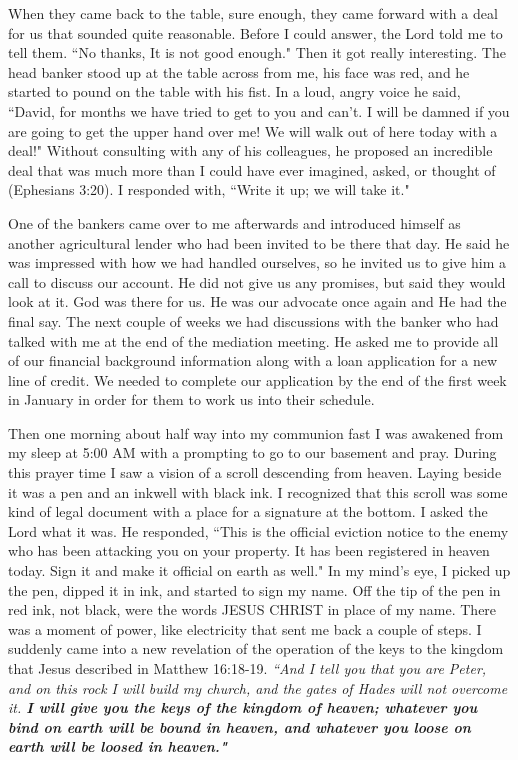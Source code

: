 \documentclass[oneside,12pt]{book}
\begin{document}
When they came back to the table, sure enough, they came forward with a deal for us that sounded quite reasonable. Before I could answer, the Lord told me to tell them. ``No thanks, It is not good enough." Then it got really interesting. The head banker stood up at the table across from me, his face was red, and he started to pound on the table with his fist. In a loud, angry voice he said, ``David, for months we have tried to get to you and can't. I will be damned if you are going to get the upper hand over me! We will walk out of here today with a deal!" Without consulting with any of his colleagues, he proposed an incredible deal that was much more than I could have ever imagined, asked, or thought of (Ephesians 3:20). I responded with, ``Write it up; we will take it." 

One of the bankers came over to me afterwards and introduced himself as another agricultural lender who had been invited to be there that day. He said he was impressed with how we had handled ourselves, so he invited us to give him a call to discuss our account. He did not give us any promises, but said they would look at it. God was there for us. He was our advocate once again and He had the final say. The next couple of weeks we had discussions with the banker who had talked with me at the end of the mediation meeting. He asked me to provide all of our financial background information along with a loan application for a new line of credit. We needed to complete our application by the end of the first week in January in order for them to work us into their schedule.

Then one morning about half way into my communion fast I was awakened from my sleep at 5:00 AM with a prompting to go to our basement and pray. During this prayer time I saw a vision of a scroll descending from heaven. Laying beside it was a pen and an inkwell with black ink. I recognized that this scroll was some kind of legal document with a place for a signature at the bottom. I asked the Lord what it was. He responded, ``This is the official eviction notice to the enemy who has been attacking you on your property. It has been registered in heaven today. Sign it and make it official on earth as well." In my mind's eye, I picked up the pen, dipped it in ink, and started to sign my name. Off the tip of the pen in red ink, not black, were the words JESUS CHRIST in place of my name. There was a moment of power, like electricity that sent me back a couple of steps. I suddenly came into a new revelation of the operation of the keys to the kingdom that Jesus described in Matthew 16:18-19. \textit{``And I tell you that you are Peter, and on this rock I will build my church, and the gates of Hades will not overcome it. \textbf{I will give you the keys of the kingdom of heaven; whatever you bind on earth will be bound in heaven, and whatever you loose on earth will be loosed in heaven."}} 
\end{document}
